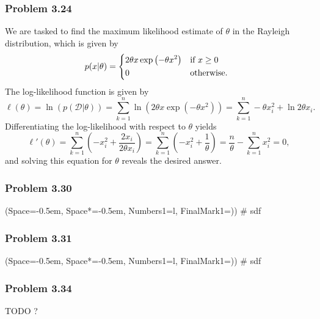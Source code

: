 \documentclass[12pt, a4paper]{article}
\newcommand{\listSpace}{-0.5em}%
\newcommand{\D}{\mathcal{D}}
\begin{document}
\subsubsection*{Problem 3.24}
We are tasked to find the maximum likelihood estimate of $\theta$ in the Rayleigh distribution, which is given by
\begin{equation*}
	p (x | \theta) = 
	\begin{dcases*}
	2 \theta x \exp \left( -\theta x^2 \right) & if $x \geq 0$ \\
	0 & otherwise.
	\end{dcases*}
\end{equation*}
The log-likelihood function is given by
\begin{equation*}
	\ell(\theta)= \ln \left( p (\D | \theta) \right) 
	= 
	\sum_{k=1}^{n} \ln \left( 2 \theta x \exp \left( -\theta x^2 \right) \right)
	= 
	\sum_{k=1}^{n} - \theta x_i^2 + \ln 2 \theta x_i.
\end{equation*}
Differentiating the log-likelihood with respect to $\theta$ yields
\begin{equation*}
	\ell'(\theta) =
	\sum_{k=1}^{n} \left(-  x_i^2 + \frac{2 x_i}{2 \theta x_i}\right)
	=
	\sum_{k=1}^{n} \left(-  x_i^2 + \frac{1}{\theta}\right)
	=
	\frac{n}{\theta} - \sum_{k=1}^{n}  x_i^2 
	= 0,
\end{equation*}
and solving this equation for $\theta$ reveals the desired answer.

\subsubsection*{Problem 3.30}
\begin{easylist}[enumerate]
	\ListProperties(Space=\listSpace, Space*=\listSpace, Numbers1=l, FinalMark1={)})
	# sdf
\end{easylist}

\subsubsection*{Problem 3.31}
\begin{easylist}[enumerate]
	\ListProperties(Space=\listSpace, Space*=\listSpace, Numbers1=l, FinalMark1={)})
	# sdf
\end{easylist}

\subsubsection*{Problem 3.34}
TODO ? 
\end{document}

